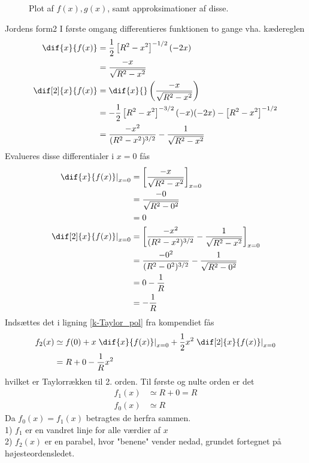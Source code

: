 \begin{figure}
	\centering
	\caption{Plot af $f(x),g(x)$, samt approksimationer af disse.} \label{fig:JordensForm}
\end{figure}
\begin{opgave}{Jordens form}{2}
I første omgang differentieres funktionen to gange vha. kædereglen
\begin{align*}
	\dif{x}{f(x)} &= \frac{1}{2}\left[R^2 - x^2\right]^{-1/2}(-2x) \\
	&= \frac{-x}{\sqrt{R^2 - x^2}} \\
	\dif[2]{x}{f(x)} &= \dif{x}{}\left(\frac{-x}{\sqrt{R^2 - x^2}}\right) \\
	&= -\frac{1}{2}\left[R^2 - x^2\right]^{-3/2}(-x)(-2x) - \left[R^2 - x^2\right]^{-1/2} \\
	&= \frac{-x^2}{(R^2 - x^2)^{3/2}} - \frac{1}{\sqrt{R^2 - x^2}}
\end{align*}
Evalueres disse differentialer i $x = 0$ fås
\begin{align*}
	\left.\dif{x}{f(x)}\right|_{x=0} &= \left[\frac{-x}{\sqrt{R^2 - x^2}}\right]_{x=0} \\
	&= \frac{-0}{\sqrt{R^2 - 0^2}} \\
	&= 0 \\
	\left.\dif[2]{x}{f(x)}\right|_{x=0} &= \left[\frac{-x^2}{(R^2 - x^2)^{3/2}} - \frac{1}{\sqrt{R^2 - x^2}}\right]_{x=0} \\
	&= \frac{-0^2}{(R^2 - 0^2)^{3/2}} - \frac{1}{\sqrt{R^2 - 0^2}} \\
	&= 0 - \frac{1}{R} \\
	&= -\frac{1}{R}
\end{align*}
\opg Indsættes det i ligning \ref{k-Taylor_pol} fra kompendiet fås
\begin{align*}
	f_2(x) &\simeq f(0) + x\left.\dif{x}{f(x)}\right|_{x=0} + \frac{1}{2}x^2\left.\dif[2]{x}{f(x)}\right|_{x=0} \\
	&= R + 0 - \frac{1}{R}x^2
\end{align*}
hvilket er Taylorrækken til 2. orden. Til første og nulte orden er det
\begin{align*}
	f_1(x) &\simeq R + 0 = R \\
	f_0(x) &\simeq R
\end{align*}
\opg Da $f_0(x) = f_1(x)$ betragtes de herfra sammen. \\
1) \enspace $f_1$ er en vandret linje for alle værdier af $x$ \\
2) \enspace $f_2(x)$ er en parabel, hvor "benene" vender nedad, grundet fortegnet på højesteordensledet.

\end{opgave}
